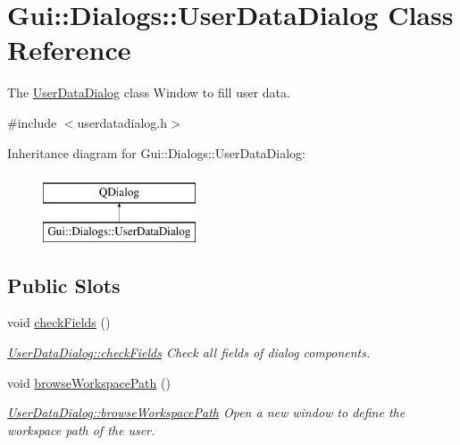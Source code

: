 \hypertarget{classGui_1_1Dialogs_1_1UserDataDialog}{\section{Gui\-:\-:Dialogs\-:\-:User\-Data\-Dialog Class Reference}
\label{classGui_1_1Dialogs_1_1UserDataDialog}
}


The \hyperlink{classGui_1_1Dialogs_1_1UserDataDialog}{User\-Data\-Dialog} class Window to fill user data.  




{\ttfamily \#include $<$userdatadialog.\-h$>$}

Inheritance diagram for Gui\-:\-:Dialogs\-:\-:User\-Data\-Dialog\-:\begin{figure}[H]
\begin{center}
\leavevmode
\includegraphics[height=2.000000cm]{d3/d81/classGui_1_1Dialogs_1_1UserDataDialog}
\end{center}
\end{figure}
\subsection*{Public Slots}
\begin{DoxyCompactItemize}
\item 
\hypertarget{classGui_1_1Dialogs_1_1UserDataDialog_a9ab536a7485460c905a8f17be8939f38}{void \hyperlink{classGui_1_1Dialogs_1_1UserDataDialog_a9ab536a7485460c905a8f17be8939f38}{check\-Fields} ()}\label{classGui_1_1Dialogs_1_1UserDataDialog_a9ab536a7485460c905a8f17be8939f38}

\begin{DoxyCompactList}\small\item\em \hyperlink{classGui_1_1Dialogs_1_1UserDataDialog_a9ab536a7485460c905a8f17be8939f38}{User\-Data\-Dialog\-::check\-Fields} Check all fields of dialog components. \end{DoxyCompactList}\item 
\hypertarget{classGui_1_1Dialogs_1_1UserDataDialog_a7516a1eb19fa88dc405c085cefa6a3b6}{void \hyperlink{classGui_1_1Dialogs_1_1UserDataDialog_a7516a1eb19fa88dc405c085cefa6a3b6}{browse\-Workspace\-Path} ()}\label{classGui_1_1Dialogs_1_1UserDataDialog_a7516a1eb19fa88dc405c085cefa6a3b6}

\begin{DoxyCompactList}\small\item\em \hyperlink{classGui_1_1Dialogs_1_1UserDataDialog_a7516a1eb19fa88dc405c085cefa6a3b6}{User\-Data\-Dialog\-::browse\-Workspace\-Path} Open a new window to define the workspace path of the user. \end{DoxyCompactList}\end{DoxyCompactItemize}
